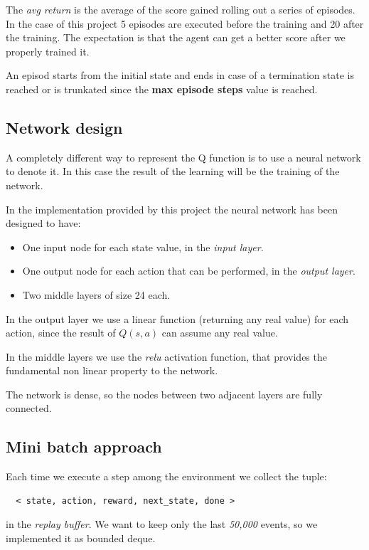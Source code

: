 \documentclass{article}
\begin{document}
The \emph{avg return} is the average of the score gained rolling out a series of episodes.
In the case of this project 5 episodes are executed before the training and 20 after the training.
The expectation is that the agent can get a better score after we properly trained it.

An episod starts from the initial state and ends in case of a termination state is reached or is trunkated since the \textbf{max episode steps} value is reached.

\subsection{Network design}

A completely different way to represent the Q function is to use a neural network to denote it.
In this case the result of the learning will be the training of the network.

In the implementation provided by this project the neural network has been designed to have:
\begin{itemize}
  \item One input node for each state value, in the \emph{input layer}.
  \item One output node for each action that can be performed, in the \emph{output layer}.
  \item Two middle layers of size 24 each.
\end{itemize}

In the output layer we use a linear function (returning any real value) for each action,
since the result of $Q(s,a)$ can assume any real value.

In the middle layers we use the \emph{relu} activation function, that provides the fundamental 
non linear property to the network.

The network is dense, so the nodes between two adjacent layers are fully connected.

\subsection{Mini batch approach}

Each time we execute a step among the environment we collect the tuple:

\begin{verbatim}
  < state, action, reward, next_state, done >
\end{verbatim}

in the \emph{replay buffer}.
We want to keep only the last \emph{50,000} events, so we implemented it as bounded deque.
\end{document}
